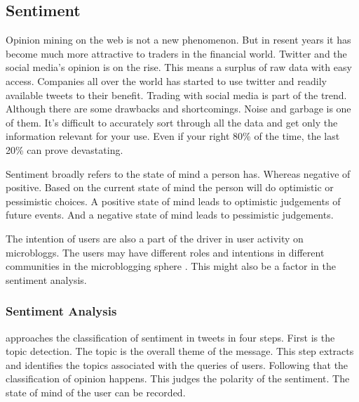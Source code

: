 
\subsection{Sentiment}

Opinion mining on the web is not a new phenomenon. But in resent years it has
become much more attractive to traders in the financial world. Twitter and the
social media's opinion is on the rise. This means a surplus of raw data with
easy access. Companies all over the world has started to use twitter and
readily available tweets to their benefit. Trading with social media is part of
the trend. Although there are some drawbacks and shortcomings. Noise and
garbage is one of them. It's difficult to accurately sort through all the data
and get only the information relevant for your use. Even if your right 80\% of
the time, the last 20\% can prove devastating.
\cite[]{stevenson12:social_media_stock_pickers}

Sentiment broadly refers to the state of mind a person has. Whereas negative of
positive. Based on the current state of mind the person will do optimistic or
pessimistic choices. A positive state of mind leads to optimistic judgements of
future events. And a negative state of mind leads to pessimistic judgements.
\cite[p4]{doukas10:sentiment_and_momentum}

The intention of users are also a part of the driver in user activity on
microbloggs. The users may have different roles and intentions in different
communities in the microblogging sphere \cite[]{java07}. This might also be a
factor in the sentiment analysis.

\subsubsection{Sentiment Analysis}


\cite[]{Li2013206} approaches the classification of sentiment in tweets in four
steps. First is the topic detection. The topic is the overall theme of the
message. This step extracts and identifies the topics associated with the
queries of users. Following that the classification of opinion happens. This
judges the polarity of the sentiment. The state of mind of the user can be
recorded.

